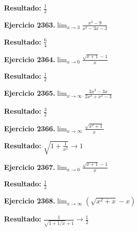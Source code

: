 \documentclass[10pt,a4paper]{article}
\begin{document}
\begin{solbox}
\textbf{Resultado:} \(\displaystyle \frac{1}{2}\)
\end{solbox}

\newpage
\begin{ejbox}
\textbf{Ejercicio 2363.}\quad $\lim_{x\to 3} \frac{x^2-9}{x^2-3x-3}$
\end{ejbox}

\begin{solbox}
\textbf{Resultado:} \(\displaystyle \frac{6}{4}\)
\end{solbox}

\begin{ejbox}
\textbf{Ejercicio 2364.}\quad $\lim_{x\to 0} \frac{\sqrt{x+1}-1}{x}$
\end{ejbox}

\begin{solbox}
\textbf{Resultado:} \(\displaystyle \frac{1}{2}\)
\end{solbox}

\begin{ejbox}
\textbf{Ejercicio 2365.}\quad $\lim_{x\to \infty} \frac{3x^3 - 3x}{2x^3 + x^2 - 3}$
\end{ejbox}

\begin{solbox}
\textbf{Resultado:} \(\displaystyle \frac{3}{2}\)
\end{solbox}

\newpage
\begin{ejbox}
\textbf{Ejercicio 2366.}\quad $\lim_{x\to \infty} \frac{\sqrt{x^2+1}}{x}$
\end{ejbox}

\begin{solbox}
\textbf{Resultado:} \(\displaystyle \sqrt{1+\frac{1}{x^2}} \to 1\)
\end{solbox}

\begin{ejbox}
\textbf{Ejercicio 2367.}\quad $\lim_{x\to 0} \frac{\sqrt{x+1}-1}{x}$
\end{ejbox}

\begin{solbox}
\textbf{Resultado:} \(\displaystyle \frac{1}{2}\)
\end{solbox}

\begin{ejbox}
\textbf{Ejercicio 2368.}\quad $\lim_{x\to \infty} (\sqrt{x^2+x} - x)$
\end{ejbox}

\begin{solbox}
\textbf{Resultado:} \(\displaystyle \frac{1}{\sqrt{1+1/x}+1} \to \frac{1}{2}\)
\end{solbox}
\end{document}
